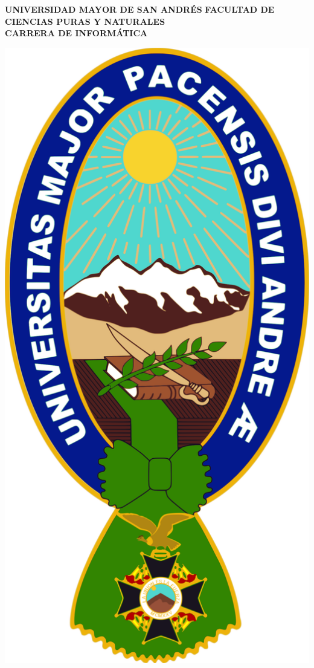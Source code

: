 \begin{titlepage} %
	\begin{center}
	    {\fontsize{20}{20}\selectfont \textbf{UNIVERSIDAD MAYOR DE SAN ANDRÉS}}
		{\fontsize{16}{16}\selectfont \textbf{FACULTAD DE CIENCIAS PURAS Y NATURALES\\
		CARRERA DE INFORMÁTICA}}
		
		\includegraphics[scale=0.093]{imagenes/logo-umsa.png}
		

\end{center}
\end{titlepage}
